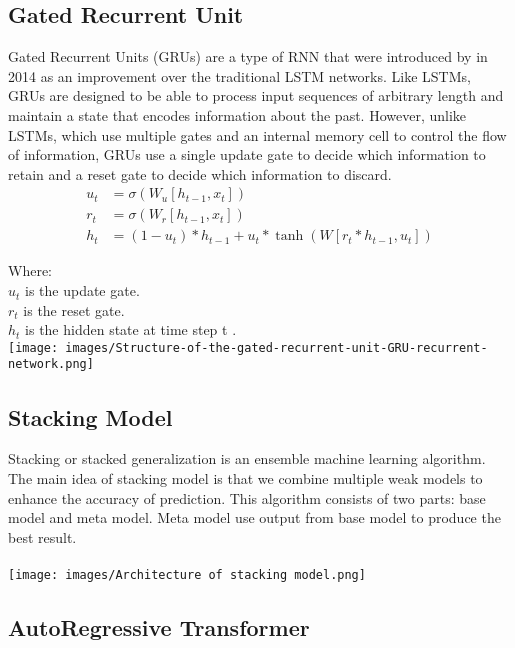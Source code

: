 \documentclass{ieeeojies}
\begin{document}
\subsection{Gated Recurrent Unit}
Gated Recurrent Units (GRUs) are a type of RNN that were introduced by in 2014 as an improvement over the traditional LSTM networks. Like LSTMs, GRUs are designed to be able to process input sequences of arbitrary length and maintain a state that encodes information about the past. However, unlike LSTMs, which use multiple gates and an internal memory cell to control the flow of information, GRUs use a single update gate to decide which information to retain and a reset gate to decide which information to discard.
\begin{align*}
        u_t &= \sigma(W_u [h_{t-1}, x_t]) \\
    r_t &= \sigma(W_r [h_{t-1}, x_t]) \\
    h_t &= (1 - u_t) \ast h_{t-1} + u_t \ast \tanh(W [r_t \ast h_{t-1}, u_t])
\end{align*}


Where: \\
\indent \textbullet \(u_t\) is the update gate.\\
\indent \textbullet \(r_t\) is the reset gate.\\
\indent \textbullet \(h_t\) is the hidden state at time step t .\\
\texttt{[image: images/Structure-of-the-gated-recurrent-unit-GRU-recurrent-network.png]}
\subsection{Stacking Model}
Stacking or stacked generalization is an ensemble machine learning algorithm. The main idea of stacking model is that we combine multiple weak models to enhance the accuracy of prediction. This algorithm consists of two parts: base model and meta model. Meta model use output from base model to produce the best result.\\ \\
\texttt{[image: images/Architecture of stacking model.png]}
\subsection{AutoRegressive Transformer}
\end{document}
